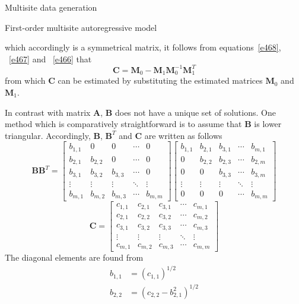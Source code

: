 \documentclass[8pt]{beamer}
\renewcommand{\emph}[1]{\textcolor{myorange}{#1}}
\begin{document}
\begin{frame}{Multisite data generation}
    \begin{block}{First-order multisite autoregressive model}
    \end{block}

    which accordingly is a symmetrical matrix, it follows from equations~\ref{e468}, ~\ref{e467} and ~\ref{e466} that
    \begin{equation}
        \mathbf{C} =  \mathbf{M}_0 - \mathbf{M}_1 \mathbf{M}_0^{-1} \mathbf{M}_1^T
        \label{e469}
    \end{equation}
    from which $\mathbf{C}$ can be estimated by substituting  the estimated matrices $\mathbf{M}_0$ and $\mathbf{M}_1$.

    In contrast with matrix $\mathbf{A}$, $\mathbf{B}$ does not have a unique set of solutions. One method which is comparatively straightforward is to assume that $\mathbf{B}$ is \emph{lower triangular}. Accordingly, $\mathbf{B}$, $\mathbf{B}^T$ and $\mathbf{C}$ are written as follows
\[
    \mathbf{B}\mathbf{B}^T = 
\begin{bmatrix}
    b_{1,1} & 0 & 0 & \cdots & 0 \\
    b_{2,1} & b_{2,2} & 0 & \cdots & 0 \\
    b_{3,1} & b_{3,2} & b_{3,3} & \cdots & 0 \\
    \vdots & \vdots & \vdots & \ddots & \vdots \\
    b_{m,1} & b_{m,2} & b_{m,3} & \cdots & b_{m,m}
\end{bmatrix}
\begin{bmatrix}
    b_{1,1} & b_{2,1} & b_{3,1} & \cdots & b_{m,1} \\
    0 & b_{2,2} & b_{2,3} & \cdots & b_{2,m} \\
    0 & 0 & b_{3,3} & \cdots & b_{3,m} \\
    \vdots & \vdots & \vdots & \ddots & \vdots \\
    0 & 0 & 0 & \cdots & b_{m,m}
\end{bmatrix}
\]
\[
    \mathbf{C} = 
\begin{bmatrix}
    c_{1,1} & c_{2,1} & c_{3,1} & \cdots & c_{m,1} \\
    c_{2,1} & c_{2,2} & c_{3,2} & \cdots & c_{m,2} \\
    c_{3,1} & c_{3,2} & c_{3,3} & \cdots & c_{m,3} \\
    \vdots & \vdots & \vdots & \ddots & \vdots \\
    c_{m,1} & c_{m,2} & c_{m,3} & \cdots & c_{m,m}
\end{bmatrix}
\]
The diagonal elements are found from 
\begin{align*}
    b_{1,1} &= (c_{1,1})^{1/2}\\
    b_{2,2} &= (c_{2,2} - b_{2,1}^2 )^{1/2}
\end{align*}

\end{frame}
\end{document}
